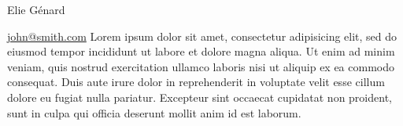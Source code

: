 \documentclass[a4paper]{genard-cv}
\begin{document}
	
\begin{header}{Elie Génard}
	\begin{contact}
	\end{contact}
\end{header}

\begin{aside}
\href{mailto:john@smith.com}{john@smith.com}
Lorem ipsum dolor sit amet, consectetur adipisicing elit, sed do eiusmod
tempor incididunt ut labore et dolore magna aliqua. Ut enim ad minim veniam,
quis nostrud exercitation ullamco laboris nisi ut aliquip ex ea commodo
consequat. Duis aute irure dolor in reprehenderit in voluptate velit esse
cillum dolore eu fugiat nulla pariatur. Excepteur sint occaecat cupidatat non
proident, sunt in culpa qui officia deserunt mollit anim id est laborum.
\end{aside}
\end{document}
